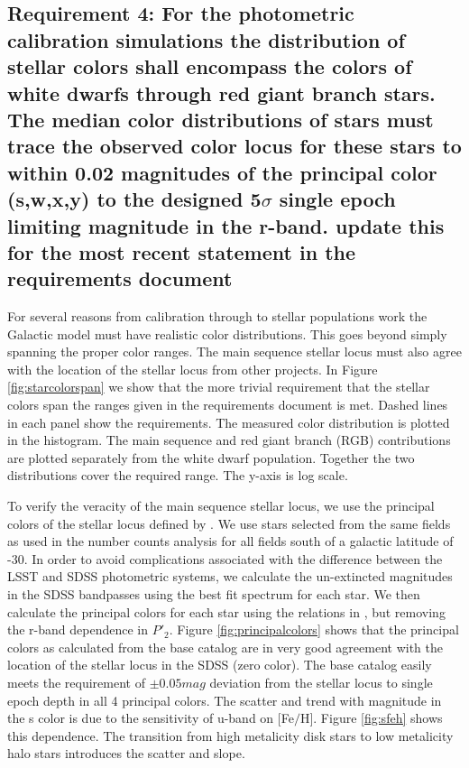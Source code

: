 \documentclass[]{article}
\begin{document}
\subsection{Requirement 4: For the photometric calibration simulations
the distribution of stellar colors shall encompass the colors of white dwarfs through red giant branch stars.
The median color distributions of stars must trace the observed color locus for these stars to within 0.02 magnitudes
of the principal color (s,w,x,y) to the designed 5$\sigma$ single epoch limiting magnitude in the r-band.
{\bf update this for the most recent statement in the requirements document}}
For several reasons from calibration through to stellar populations work the Galactic model must have realistic color distributions.
This goes beyond simply spanning the proper color ranges.  The main sequence stellar locus must also agree with the location of the
stellar locus from other projects.  In Figure \ref{fig:starcolorspan} we show that the more trivial requirement that the stellar
colors span the ranges given in the requirements document is met.  Dashed lines in each panel show the requirements.  The measured
color distribution is plotted in the histogram.  The main sequence and red giant branch (RGB) contributions are plotted separately from
the white dwarf population.  Together the two distributions cover the required range.  The y-axis is log scale.

To verify the veracity of the main sequence stellar locus, we use the principal colors of the stellar locus defined by \cite{ivezic04}.
We use stars selected from the same fields as used in the number counts analysis for all fields south of a galactic latitude of -30.
In order to avoid complications associated with the difference between the LSST and SDSS photometric systems, we calculate the un-extincted 
magnitudes in the SDSS bandpasses using the best fit spectrum for each star.  We then calculate
the principal colors for each star using the relations in \cite{ivezic04}, but removing the r-band dependence in $P\prime_{2}$.  Figure
\ref{fig:principalcolors} shows that the principal colors as calculated from the base catalog are in very good agreement with
the location of the stellar locus in the SDSS (zero color).  The base catalog easily meets the requirement of $\pm0.05mag$ deviation
from the stellar locus to single epoch depth in all 4 principal colors.  The scatter and trend with magnitude in the s color is due to 
the sensitivity of u-band on $[$Fe$/$H$]$.  Figure \ref{fig:sfeh} shows this dependence.  The transition from high metalicity disk stars to low 
metalicity halo stars introduces the scatter and slope.
\end{document}
